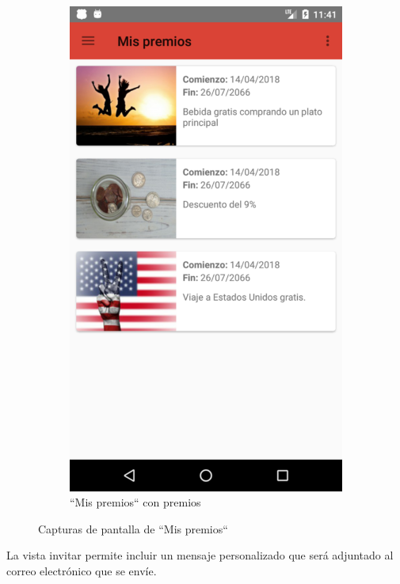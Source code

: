 \documentclass[twoside]{report}
\begin{document}
\begin{figure}[H]
\begin{center}
\begin{subfigure}[t]{.3\linewidth}
		\includegraphics[scale=0.25]{images/userguide/10.png}
		\caption{“Mis premios“ con premios}
	\end{subfigure}
\caption{Capturas de pantalla de “Mis premios“}
\end{center}
\end{figure}

La vista invitar permite incluir un mensaje personalizado que será adjuntado al correo electrónico que se envíe.
\end{document}
